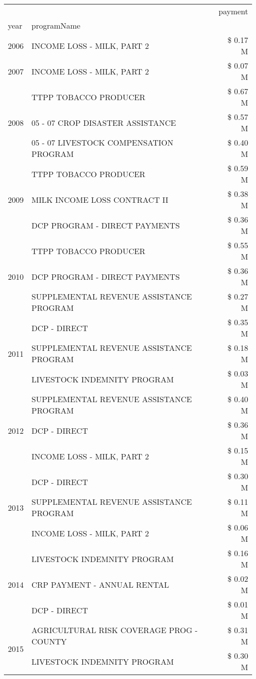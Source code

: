 \begin{tabular}{llr}
\toprule
 &  & payment \\
year & programName &  \\
\midrule
2006 & INCOME LOSS - MILK, PART 2 & \$ 0.17 M \\
\cline{1-3}
2007 & INCOME LOSS - MILK, PART 2 & \$ 0.07 M \\
\cline{1-3}
\multirow[t]{3}{*}{2008} & TTPP TOBACCO PRODUCER & \$ 0.67 M \\
 & 05 - 07 CROP DISASTER ASSISTANCE & \$ 0.57 M \\
 & 05 - 07 LIVESTOCK COMPENSATION PROGRAM & \$ 0.40 M \\
\cline{1-3}
\multirow[t]{3}{*}{2009} & TTPP TOBACCO PRODUCER & \$ 0.59 M \\
 & MILK INCOME LOSS CONTRACT II & \$ 0.38 M \\
 & DCP PROGRAM - DIRECT PAYMENTS & \$ 0.36 M \\
\cline{1-3}
\multirow[t]{3}{*}{2010} & TTPP TOBACCO PRODUCER & \$ 0.55 M \\
 & DCP PROGRAM - DIRECT PAYMENTS & \$ 0.36 M \\
 & SUPPLEMENTAL REVENUE ASSISTANCE PROGRAM & \$ 0.27 M \\
\cline{1-3}
\multirow[t]{3}{*}{2011} & DCP - DIRECT & \$ 0.35 M \\
 & SUPPLEMENTAL REVENUE ASSISTANCE PROGRAM & \$ 0.18 M \\
 & LIVESTOCK INDEMNITY PROGRAM & \$ 0.03 M \\
\cline{1-3}
\multirow[t]{3}{*}{2012} & SUPPLEMENTAL REVENUE ASSISTANCE PROGRAM & \$ 0.40 M \\
 & DCP - DIRECT & \$ 0.36 M \\
 & INCOME LOSS - MILK, PART 2 & \$ 0.15 M \\
\cline{1-3}
\multirow[t]{3}{*}{2013} & DCP - DIRECT & \$ 0.30 M \\
 & SUPPLEMENTAL REVENUE ASSISTANCE PROGRAM & \$ 0.11 M \\
 & INCOME LOSS - MILK, PART 2 & \$ 0.06 M \\
\cline{1-3}
\multirow[t]{3}{*}{2014} & LIVESTOCK INDEMNITY PROGRAM & \$ 0.16 M \\
 & CRP PAYMENT - ANNUAL RENTAL & \$ 0.02 M \\
 & DCP - DIRECT & \$ 0.01 M \\
\cline{1-3}
\multirow[t]{3}{*}{2015} & AGRICULTURAL RISK COVERAGE PROG - COUNTY & \$ 0.31 M \\
 & LIVESTOCK INDEMNITY PROGRAM & \$ 0.30 M \\

\end{tabular}
